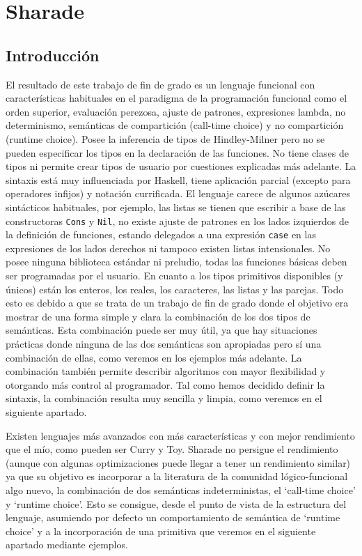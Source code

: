 \documentclass[class=article, crop=false]{standalone}
\begin{document}
\section{Sharade}
\subsection{Introducción}

El resultado de este trabajo de fin de grado es un lenguaje funcional con características
habituales en el paradigma de la programación funcional como el orden superior, evaluación
perezosa, ajuste de patrones, expresiones lambda, no determinismo, semánticas de compartición
(call-time choice) y no compartición (runtime choice). Posee la inferencia de tipos de
Hindley-Milner pero no se pueden especificar los tipos en la declaración de las funciones. No
tiene clases de tipos ni permite crear tipos de usuario por cuestiones explicadas más
adelante. La sintaxis está muy influenciada por Haskell, tiene aplicación parcial (excepto
para operadores infijos) y notación currificada. El lenguaje carece de algunos azúcares
sintácticos habituales, por ejemplo, las listas se tienen que escribir a base de las
constructoras \verb`Cons` y \verb`Nil`, no existe ajuste de patrones en los lados izquierdos
de la definición de funciones, estando delegados a una  expresión \verb`case` en las
expresiones de los lados derechos ni tampoco existen listas intensionales. No posee ninguna
biblioteca estándar ni preludio, todas las funciones básicas deben ser programadas por el
usuario. En cuanto a los tipos primitivos disponibles (y únicos) están los enteros, los
reales, los caracteres, las listas y las parejas. Todo esto es debido a que se trata de un
trabajo de fin de grado donde el objetivo era mostrar de una forma simple y clara la
combinación de los dos tipos de semánticas. Esta combinación puede ser muy útil, ya que hay
situaciones prácticas donde ninguna de las dos semánticas son apropiadas pero sí una
combinación de ellas\cite{lopez2009flexible}, como veremos en los ejemplos más
adelante. La combinación también permite describir algoritmos con mayor flexibilidad y
otorgando más control al programador. Tal como hemos decidido definir la sintaxis, la
combinación resulta muy sencilla y limpia, como veremos en el siguiente apartado.

Existen lenguajes más avanzados con más características y con mejor rendimiento que el mío,
como pueden ser Curry y Toy. Sharade no persigue el rendimiento (aunque con algunas
optimizaciones puede llegar a tener un rendimiento similar) ya que su objetivo es incorporar
a la literatura de la comunidad lógico-funcional algo nuevo, la combinación de dos semánticas
indeterministas, el `call-time choice' y `runtime choice'. Esto se consigue, desde el punto
de vista de la estructura del lenguaje, asumiendo por defecto un comportamiento de semántica
de `runtime choice' y a la incorporación de una primitiva que veremos en el siguiente
apartado mediante ejemplos.
\end{document}
